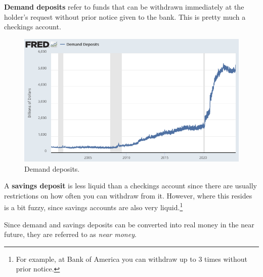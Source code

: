 \documentclass{article}
\begin{document}
    \begin{definition}
      \textbf{Demand deposits} refer to funds that can be withdrawn immediately at the holder's request without prior notice given to the bank. This is pretty much a checkings account. 
      \begin{figure}[H]
        \centering 
        \includegraphics[scale=0.4]{img/demand_deposit.png}
        \caption{Demand deposits. } 
        \label{fig:demand_deposit}
      \end{figure}
    \end{definition}

    \begin{definition}
      A \textbf{savings deposit} is less liquid than a checkings account since there are usually restrictions on how often you can withdraw from it. However, where this resides is a bit fuzzy, since savings accounts are also very liquid.\footnote{For example, at Bank of America you can withdraw up to 3 times without prior notice. }

    \end{definition}

    Since demand and savings deposits can be converted into real money in the near future, they are referred to as \textit{near money}. 
\end{document}
